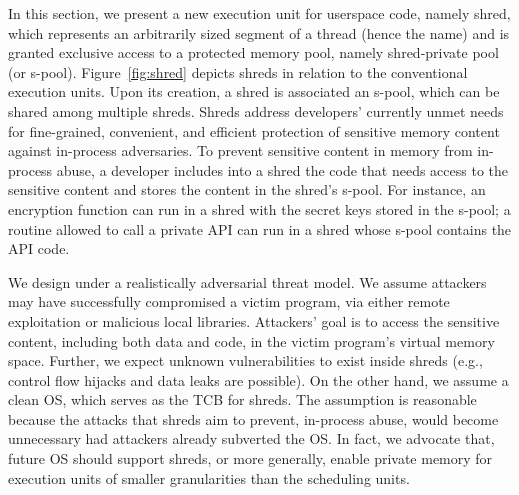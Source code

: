 %

In this section, we present a new execution unit for userspace code, namely shred, which represents an arbitrarily sized segment of a thread (hence the name) and is granted exclusive access to a protected memory pool, namely shred-private pool (or s-pool). Figure~\ref{fig:shred} depicts shreds in relation to the conventional execution units. Upon its creation, a shred is associated an s-pool, which can be shared among multiple shreds. Shreds address developers' currently unmet needs for fine-grained, convenient, and efficient protection of sensitive memory content against in-process adversaries. To prevent sensitive content in memory from in-process abuse, a developer includes into a shred the code that needs access to the sensitive content and stores the content in the shred's s-pool. For instance, an encryption function can run in a shred with the secret keys stored in the s-pool; a routine allowed to call a private API can run in a shred whose s-pool contains the API code.


We design \shreds under a realistically adversarial threat model. We assume attackers may have successfully compromised a victim program, via either remote exploitation or malicious local libraries. Attackers' goal is to access the sensitive content, including both data and code, in the victim program's virtual memory space. Further, we expect unknown vulnerabilities to exist inside shreds (e.g., control flow hijacks and data leaks are possible). On the other hand, we assume a clean OS, which serves as the TCB for shreds. The assumption is reasonable because the attacks that shreds aim to prevent, in-process abuse, would become unnecessary had attackers already subverted the OS. In fact, we advocate that, future OS should support shreds, or more generally, enable private memory for execution units of smaller granularities than the scheduling units.

